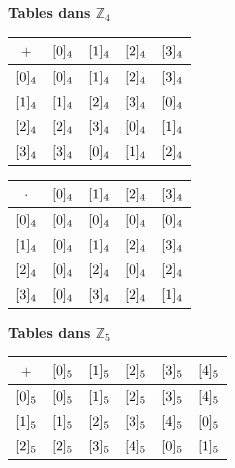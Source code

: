 \begin{enumerate}[label=\thechapter.\arabic*, font=\bfseries, itemsep=7mm,labelsep*=3mm,left=0mm]
\begin{enumerate}[label=\alph*),itemsep=5mm,left=-1mm,labelsep*=2mm]
\noindent
\begin{minipage}[t]{0.48\linewidth}
	\vspace{0pt}\centering
	\textbf{Tables dans $\mathbb{Z}_4$} \\ \vspace{0.2cm}
	\renewcommand{\arraystretch}{1.1}
	\setlength{\tabcolsep}{3pt}
	\begin{tabular}{c|cccc}
		$+$ & $\cl[4]{0}$ & $\cl[4]{1}$ & $\cl[4]{2}$ & $\cl[4]{3}$ \\ \hline
		$\cl[4]{0}$ & $\cl[4]{0}$ & $\cl[4]{1}$ & $\cl[4]{2}$ & $\cl[4]{3}$ \\
		$\cl[4]{1}$ & $\cl[4]{1}$ & $\cl[4]{2}$ & $\cl[4]{3}$ & $\cl[4]{0}$ \\
		$\cl[4]{2}$ & $\cl[4]{2}$ & $\cl[4]{3}$ & $\cl[4]{0}$ & $\cl[4]{1}$ \\
		$\cl[4]{3}$ & $\cl[4]{3}$ & $\cl[4]{0}$ & $\cl[4]{1}$ & $\cl[4]{2}$
	\end{tabular}
	\quad
	\begin{tabular}{c|cccc}
		$\cdot$ & $\cl[4]{0}$ & $\cl[4]{1}$ & $\cl[4]{2}$ & $\cl[4]{3}$ \\ \hline
		$\cl[4]{0}$ & $\cl[4]{0}$ & $\cl[4]{0}$ & $\cl[4]{0}$ & $\cl[4]{0}$ \\
		$\cl[4]{1}$ & $\cl[4]{0}$ & $\cl[4]{1}$ & $\cl[4]{2}$ & $\cl[4]{3}$ \\
		$\cl[4]{2}$ & $\cl[4]{0}$ & $\cl[4]{2}$ & $\cl[4]{0}$ & $\cl[4]{2}$ \\
		$\cl[4]{3}$ & $\cl[4]{0}$ & $\cl[4]{3}$ & $\cl[4]{2}$ & $\cl[4]{1}$
	\end{tabular}
\end{minipage}%
\hfill
\begin{minipage}[t]{0.48\linewidth}
	\vspace{0pt}\centering
	\textbf{Tables dans $\mathbb{Z}_5$} \\ \vspace{0.2cm}
	\renewcommand{\arraystretch}{1.1}
	\setlength{\tabcolsep}{3pt}
	\begin{tabular}{c|ccccc}
		$+$ & $\cl[5]{0}$ & $\cl[5]{1}$ & $\cl[5]{2}$ & $\cl[5]{3}$ & $\cl[5]{4}$ \\ \hline
		$\cl[5]{0}$ & $\cl[5]{0}$ & $\cl[5]{1}$ & $\cl[5]{2}$ & $\cl[5]{3}$ & $\cl[5]{4}$ \\
		$\cl[5]{1}$ & $\cl[5]{1}$ & $\cl[5]{2}$ & $\cl[5]{3}$ & $\cl[5]{4}$ & $\cl[5]{0}$ \\
		$\cl[5]{2}$ & $\cl[5]{2}$ & $\cl[5]{3}$ & $\cl[5]{4}$ & $\cl[5]{0}$ & $\cl[5]{1}$ \\

\end{tabular}
\end{minipage}
\end{enumerate}
\end{enumerate}

